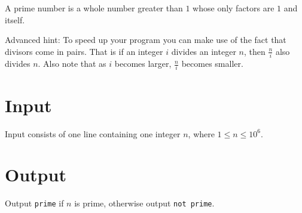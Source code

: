 
A prime number is a whole number greater than $1$ whose only factors are $1$ and itself.

Advanced hint: To speed up your program you can make use of the fact that divisors come in pairs.
That is if an integer $i$ divides an integer $n$, then $\frac{n}{i}$ also divides $n$.
Also note that as $i$ becomes larger, $\frac{n}{i}$ becomes smaller.

\section*{Input}
Input consists of one line containing one integer $n$, where $1 \leq n \leq 10^6$.

\section*{Output}
Output \texttt{prime} if $n$ is prime, otherwise output \texttt{not prime}.

